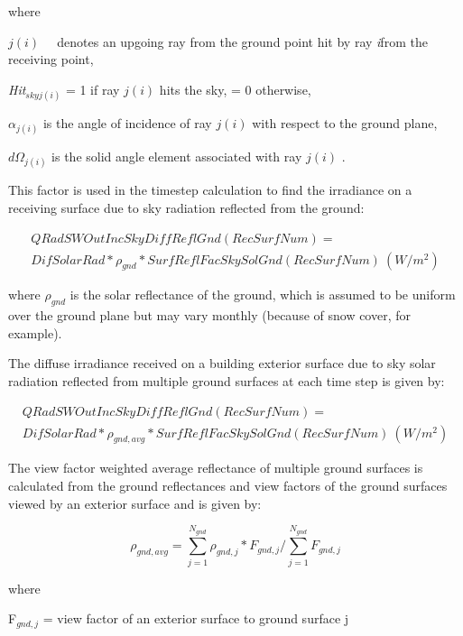 where

\emph{\(j(i)\) ~}~denotes an upgoing ray from the ground point hit by ray \emph{i}from the receiving point,

\emph{Hit\(_{skyj(i)}\)} = 1 if ray \emph{\(j(i)\)} hits the sky, = 0 otherwise,

\({\alpha_{j(i)}}\) is the angle of incidence of ray \(j(i)\) with respect to the ground plane,

\(d{\Omega_{j(i)}}\) is the solid angle element associated with ray \(j(i)\) .

This factor is used in the timestep calculation to find the irradiance on a receiving surface due to sky radiation reflected from the ground:

\begin{equation}
\begin{array}{l}
{QRadSWOutIncSkyDiffReflGnd(RecSurfNum)} = \\{DifSolarRad * {\rho_{gnd}} * SurfReflFacSkySolGnd(RecSurfNum)~ (W/m^{2})}
\end{array}
\end{equation}

where \({\rho_{gnd}}\) is the solar reflectance of the ground, which is assumed to be uniform over the ground plane but may vary monthly (because of snow cover, for example).


The diffuse irradiance received on a building exterior surface due to sky solar radiation reflected from multiple ground surfaces at each time step is given by:

\begin{equation}
\begin{array}{l}
{QRadSWOutIncSkyDiffReflGnd(RecSurfNum)} = \\{DifSolarRad * {\rho_{gnd,avg}} * SurfReflFacSkySolGnd(RecSurfNum)~ (W/m^{2})}
\end{array}
\end{equation}

The view factor weighted average reflectance of multiple ground surfaces is calculated from the ground reflectances and view factors of the ground surfaces viewed by an exterior surface and is given by:

\begin{equation}
{\rho_{gnd,avg}} = \sum\limits_{j = 1}^{{N_{gnd}}} {\rho_{gnd,j}} * {F_{gnd,j}} / \sum\limits_{j = 1}^{{N_{gnd}}} {F_{gnd,j}}
\end{equation}

where

F\(_{gnd,j}\) = view factor of an exterior surface to ground surface j

